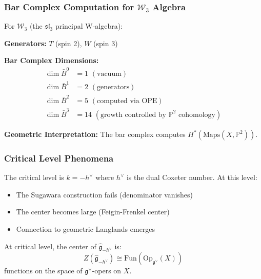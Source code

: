 \subsubsection{Bar Complex Computation for $\mathcal{W}_3$ Algebra}

\begin{example}\label{ex:w3-bar}
For $\mathcal{W}_3$ (the $\mathfrak{sl}_3$ principal W-algebra):

\textbf{Generators:} $T$ (spin 2), $W$ (spin 3)

\textbf{Bar Complex Dimensions:}
\begin{align}
\dim \bar{B}^0 &= 1 \,\, (\text{vacuum}) \\
\dim \bar{B}^1 &= 2 \,\, (\text{generators}) \\
\dim \bar{B}^2 &= 5 \,\, (\text{computed via OPE}) \\
\dim \bar{B}^3 &= 14 \,\, (\text{growth controlled by } \mathbb{P}^2 \text{ cohomology})
\end{align}

\textbf{Geometric Interpretation:} The bar complex computes $H^*(\mathrm{Maps}(X, \mathbb{P}^2))$.
\end{example}

\subsubsection{Critical Level Phenomena}

\begin{definition}\label{def:critical}
The critical level is $k = -h^\vee$ where $h^\vee$ is the dual Coxeter number. At this level:
\begin{itemize}
\item The Sugawara construction fails (denominator vanishes)
\item The center becomes large (Feigin-Frenkel center)
\item Connection to geometric Langlands emerges
\end{itemize}
\end{definition}

\begin{theorem}\label{thm:ff-center}
At critical level, the center of $\widehat{\mathfrak{g}}_{-h^\vee}$ is:
\[
Z(\widehat{\mathfrak{g}}_{-h^\vee}) \cong \mathrm{Fun}(\mathrm{Op}_{\mathfrak{g}^\vee}(X))
\]
functions on the space of $\mathfrak{g}^\vee$-opers on $X$.
\end{theorem}

